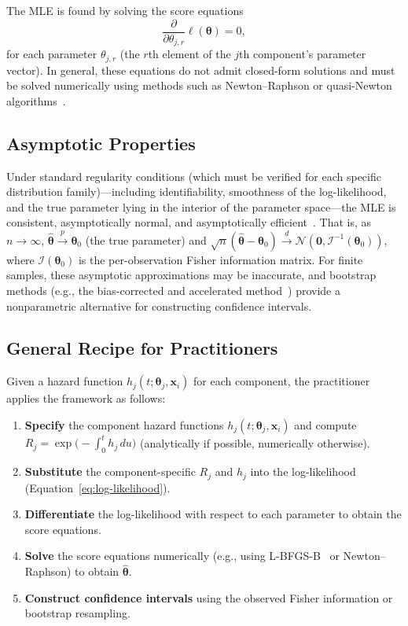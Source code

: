 \documentclass[11pt]{article}
\theoremstyle{definition}
\theoremstyle{plain}
\renewcommand{\v}[1]{\boldsymbol{#1}}
\newcommand{\btheta}{\v{\theta}}
\begin{document}
The MLE is found by solving the score equations
\begin{equation}
\label{eq:score}
    \frac{\partial}{\partial \theta_{j,r}} \ell(\btheta) = 0,
\end{equation}
for each parameter $\theta_{j,r}$ (the $r$th element of the $j$th
component's parameter vector).
In general, these equations do not admit closed-form solutions and must
be solved numerically using methods such as Newton--Raphson or
quasi-Newton algorithms~\citep{nocedal2006numerical,byrd1995}.

\subsection{Asymptotic Properties}
\label{sec:asymptotic-properties}

Under standard regularity conditions (which must be verified for each
specific distribution family)---including identifiability,
smoothness of the log-likelihood, and the true parameter lying in the
interior of the parameter space---the MLE is consistent, asymptotically normal, and
asymptotically efficient~\citep{casella2002statistical,lehmann1998theory}.
That is, as $n \to \infty$,
$\hat{\btheta} \xrightarrow{p} \btheta_0$ (the true parameter) and
$\sqrt{n}(\hat{\btheta} - \btheta_0) \xrightarrow{d}
\mathcal{N}(\v{0}, \mathcal{I}^{-1}(\btheta_0))$,
where $\mathcal{I}(\btheta_0)$ is the per-observation Fisher information matrix.
For finite samples, these asymptotic approximations may be inaccurate,
and bootstrap methods (e.g., the bias-corrected and accelerated
method~\citep{efron1987better,efron1994introduction}) provide a
nonparametric alternative for constructing confidence intervals.

\subsection{General Recipe for Practitioners}
\label{sec:recipe}

Given a hazard function $h_j(t; \v{\theta}_j, \v{x}_i)$ for each
component, the practitioner applies the framework as follows:
\begin{enumerate}
    \item \textbf{Specify} the component hazard functions
    $h_j(t; \v{\theta}_j, \v{x}_i)$ and compute
    $R_j = \exp\!\bigl(-\int_0^t h_j \, du\bigr)$
    (analytically if possible, numerically otherwise).
    \item \textbf{Substitute} the component-specific $R_j$ and $h_j$ into
    the log-likelihood (Equation~\eqref{eq:log-likelihood}).
    \item \textbf{Differentiate} the log-likelihood with respect to each
    parameter to obtain the score equations.
    \item \textbf{Solve} the score equations numerically (e.g., using
    L-BFGS-B~\citep{byrd1995} or Newton--Raphson) to obtain
    $\hat{\btheta}$.
    \item \textbf{Construct confidence intervals} using the observed
    Fisher information or bootstrap resampling.
\end{enumerate}
\end{document}
